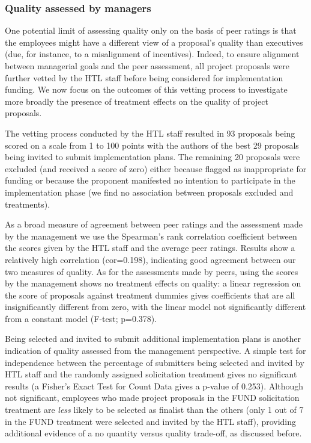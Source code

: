 \documentclass[11pt]{article}
\begin{document}
\subsubsection{Quality assessed by
managers}\label{quality-assessed-by-managers}

One potential limit of assessing quality only on the basis of peer
ratings is that the employees might have a different view of a
proposal's quality than executives (due, for instance, to a misalignment
of incentives). Indeed, to ensure alignment between managerial goals and
the peer assessment, all project proposals were further vetted by the
HTL staff before being considered for implementation funding. We now
focus on the outcomes of this vetting process to investigate more
broadly the presence of treatment effects on the quality of project
proposals.

The vetting process conducted by the HTL staff resulted in 93 proposals
being scored on a scale from 1 to 100 points with the authors of the
best 29 proposals being invited to submit implementation plans. The
remaining 20 proposals were excluded (and received a score of zero)
either because flagged as inappropriate for funding or because the
proponent manifested no intention to participate in the implementation
phase (we find no association between proposals excluded and
treatments).

As a broad measure of agreement between peer ratings and the assessment
made by the management we use the Spearman's rank correlation
coefficient between the scores given by the HTL staff and the average
peer ratings. Results show a relatively high correlation (cor=0.198),
indicating good agreement between our two measures of quality. As for
the assessments made by peers, using the scores by the management shows
no treatment effects on quality: a linear regression on the score of
proposals against treatment dummies gives coefficients that are all
insignificantly different from zero, with the linear model not
significantly different from a constant model (F-test; p=0.378).

Being selected and invited to submit additional implementation plans is
another indication of quality assessed from the management perspective.
A simple test for independence between the percentage of submitters
being selected and invited by HTL staff and the randomly assigned
solicitation treatment gives no significant results (a Fisher's Exact
Test for Count Data gives a p-value of 0.253). Although not significant,
employees who made project proposals in the FUND solicitation treatment
are \emph{less} likely to be selected as finalist than the others (only
1 out of 7 in the FUND treatment were selected and invited by the HTL
staff), providing additional evidence of a no quantity versus quality
trade-off, as discussed before.
\end{document}
